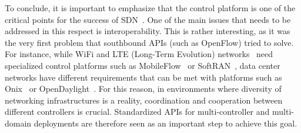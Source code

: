 

To conclude, it is important to emphasize that the control platform is one of the critical points for 
the success of SDN~\cite{casemore2012-1}.
One of the main issues that needs to be addressed in this respect is interoperability. 
This is rather interesting, as it was the very first problem that southbound APIs (such as OpenFlow) tried to solve.
For instance, while WiFi and LTE (Long-Term Evolution) networks~\cite{Kwan2010survey} need specialized control platforms such as MobileFlow~\cite{pentikousis2013} or SoftRAN~\cite{gudipati2013}, 
data center networks have different requirements that can be met with platforms such as Onix~\cite{koponen-1} or OpenDaylight~\cite{opendaylight2013}. 
For this reason, in environments where diversity of networking infrastructures is a reality, coordination and cooperation between different controllers is crucial. 
Standardized APIs for multi-controller and multi-domain deployments are therefore seen as an important step to achieve this goal.

